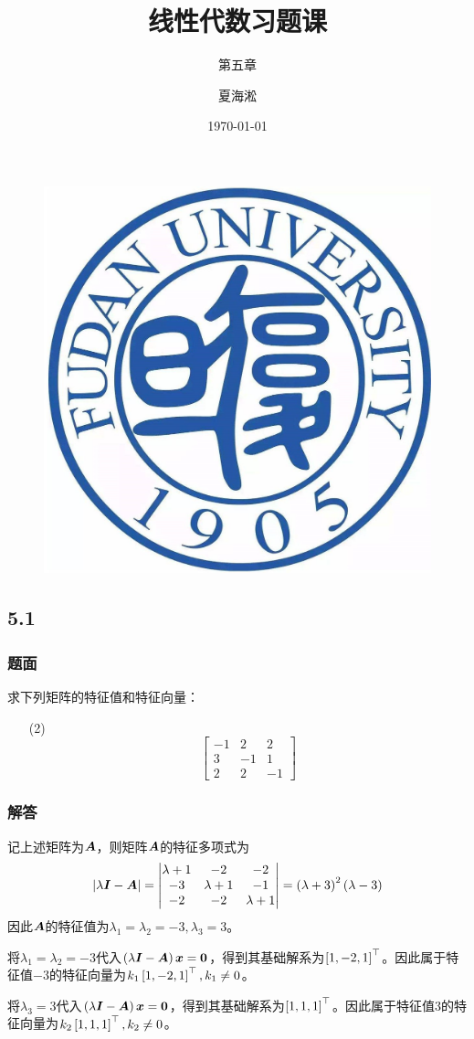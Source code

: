 \documentclass{beamer}
\author{夏海淞}
\title{线性代数习题课}
\subtitle{第五章}
\date{\today}
\begin{document}
\setlength{\parskip}{0.45\baselineskip}

\begin{frame}
    \titlepage
    \begin{figure}[htpb]
        \begin{center}
            \vspace*{-0.5cm}
            \includegraphics[width=0.1\linewidth]{../../pic/FDU.jpeg}
        \end{center}
    \end{figure}
\end{frame}

\subsection*{5.1}
\begin{frame}
    \frametitle{题面}
    求下列矩阵的特征值和特征向量：
    \begin{enumerate}
        \item[(2)]{
              \begin{equation*}
                  \begin{bmatrix}
                      -1 & 2  & 2  \\
                      3  & -1 & 1  \\
                      2  & 2  & -1
                  \end{bmatrix}
              \end{equation*}
              }
    \end{enumerate}
\end{frame}

\begin{frame}
    \frametitle{解答}
    记上述矩阵为\(\boldsymbol{A}\)，则矩阵\(\boldsymbol{A}\)的特征多项式为
    \begin{equation*}
        \left|\lambda\boldsymbol{I}-\boldsymbol{A} \right| =
        \begin{vmatrix}
            \lambda+1 & -2        & -2        \\
            -3        & \lambda+1 & -1        \\
            -2        & -2        & \lambda+1
        \end{vmatrix}=\left( \lambda+3 \right)^2\left( \lambda-3 \right)
    \end{equation*}
    因此\(\boldsymbol{A}\)的特征值为\(\lambda_1=\lambda_2=-3,\lambda_3=3\)。
    \pause

    将\(\lambda_1=\lambda_2=-3\)代入\(\left( \lambda\boldsymbol{I}-\boldsymbol{A} \right)\boldsymbol{x}=\boldsymbol{0}\)，得到其基础解系为\(\left[ 1,-2,1 \right]^\top\)。因此属于特征值\(-3\)的特征向量为\(k_1\left[ 1,-2,1 \right]^\top,k_1\neq0\)。

    将\(\lambda_3=3\)代入\(\left( \lambda\boldsymbol{I}-\boldsymbol{A} \right)\boldsymbol{x}=\boldsymbol{0}\)，得到其基础解系为\(\left[ 1,1,1 \right]^\top\)。因此属于特征值\(3\)的特征向量为\(k_2\left[ 1,1,1 \right]^\top,k_2\neq0\)。
\end{frame}
\end{document}
